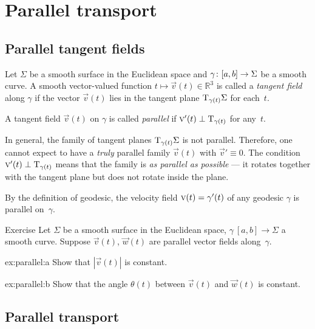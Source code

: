 \chapter{Parallel transport}
\label{chap:parallel-transport}

\section{Parallel tangent fields}

Let $\Sigma$ be a smooth surface in the Euclidean space and $\gamma\:[a,b]\z\to \Sigma$ be a smooth curve.
A smooth vector-valued function $t\mapsto {\vec v}(t) \in \mathbb{R}^3$ is called a \emph{tangent field} along $\gamma$ if
the vector ${\vec v}(t)$ lies in the tangent plane $\mathrm{T}_{\gamma(t)}\Sigma$ for each~$t$.

A tangent field ${\vec v}(t)$ on $\gamma$ is called \emph{parallel} if ${\text{\sc{v}}}'(t)\perp\mathrm{T}_{\gamma(t)}$ for any~$t$.

In general, the family of tangent planes $\mathrm{T}_{\gamma(t)}\Sigma$ is not parallel.
Therefore, one cannot expect to have a \textit{truly} parallel family ${\vec v}(t)$ with ${\vec v}'\equiv 0$.
The condition ${\text{\sc{v}}}'(t)\perp\mathrm{T}_{\gamma(t)}$ means that the family is \textit{as parallel as possible} --- it rotates together with the tangent plane but does not rotate inside the plane.

By the definition of geodesic, the velocity field ${\vec v}(t)\z=\gamma'(t)$ of any geodesic $\gamma$ is parallel on~$\gamma$.

\begin{thm}{Exercise}\label{ex:parallel}
Let $\Sigma$ be a smooth surface in the Euclidean space, 
$\gamma\:[a,b]\to \Sigma$ a smooth curve.
Suppose ${\vec v}(t)$, $\vec w(t)$ are parallel vector fields along~$\gamma$.

\begin{subthm}{ex:parallel:a} Show that $|{\vec v}(t)|$ is constant.
\end{subthm}

\begin{subthm}{ex:parallel:b} Show that the angle $\theta(t)$ between ${\vec v}(t)$ and $\vec w(t)$ is constant.
\end{subthm}

\end{thm}

\section{Parallel transport}

